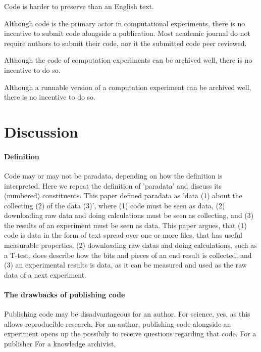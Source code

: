 Code is harder to preserve than an English text.

Although code is the primary actor in computational experiments,
there is no incentive to submit code alongside a publication.
Most academic journal do not require authors to submit their code,
nor it the submitted code peer reviewed.

Although the code of computation experiments can be archived well, 
there is no incentive to do so.

Although a runnable version of a computation experiment can be archived well, 
there is no incentive to do so.

\section{Discussion}

\paragraph{Definition}

Code may or may not be paradata, depending on how the definition
is interpreted.
Here we repeat the definition of 'paradata' and discuss 
its (numbered) constituents.
This paper defined paradata as 'data (1) about the collecting (2) of the data (3)',
where (1) code must be seen as data, (2) downloading raw data
and doing calculations must be seen as collecting, and (3) the
results of an experiment must be seen as data.
This paper argues, that (1) code is data in the form of text spread
over one or more files, that has useful measurable properties, 
(2) downloading raw datas and doing calculations, such as a T-test,
does describe how the bits and pieces of an end result is collected,
and (3) an experimental results is data, as it can be measured and
used as the raw data of a next experiment.

\paragraph{The drawbacks of publishing code}

Publishing code may be disadvantageous for an author.
For science, yes, as this allows reproducible research.
For an author, publishing code alongside an experiment opens up
the possibily to receive questions regarding that code.
For a publisher
For a knowledge archivist, 

